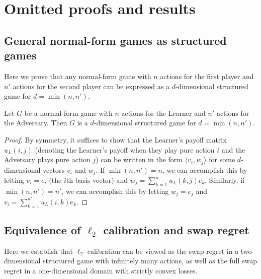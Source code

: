 \section{Omitted proofs and results}

\subsection{General normal-form games as structured games}\label{sec:nfg-as-structured}

Here we prove that any normal-form game with $n$ actions for the first player and $n'$ actions for the second player can be expressed as a $d$-dimensional structured game for $d = \min(n, n')$.

\begin{lemma}\label{lem:nfg-as-structured}
Let $G$ be a normal-form game with $n$ actions for the Learner and $n'$ actions for the Adversary. Then $G$ is a $d$-dimensional structured game for $d = \min(n, n')$.
\end{lemma}
\begin{proof}
By symmetry, it suffices to show that the Learner's payoff matrix $u_L(i, j)$ (denoting the Learner's payoff when they play pure action $i$ and the Adversary plays pure action $j$) can be written in the form $\langle v_i, w_j\rangle$ for some $d$-dimensional vectors $v_i$ and $w_j$. If $\min(n, n') = n$, we can accomplish this by letting $v_{i} = e_{i}$ (the $i$th basis vector) and $w_{j} = \sum_{k=1}^{n} u_{L}(k, j)e_{k}$. Similarly, if $\min(n, n') = n'$, we can accomplish this by letting $w_{j} = e_{j}$ and $v_{i} = \sum_{k=1}^{n'} u_{L}(i, k)e_{k}$.
\end{proof}

\subsection{Equivalence of $\ell_2$ calibration and swap regret}\label{sec:calib_swap_regret}

Here we establish that $\ell_2$ calibration can be viewed as the swap regret in a two-dimensional structured game with infinitely many actions, as well as the full swap regret in a one-dimensional domain with strictly convex losses.

